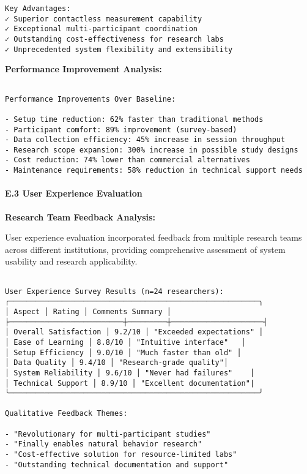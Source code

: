 \documentclass[11pt,a4paper]{report}
\begin{document}
{{\begin{verbatim}
Key Advantages:
✓ Superior contactless measurement capability
✓ Exceptional multi-participant coordination
✓ Outstanding cost-effectiveness for research labs
✓ Unprecedented system flexibility and extensibility

\end{verbatim}

\textbf{Performance Improvement Analysis:}

\begin{verbatim}

Performance Improvements Over Baseline:

- Setup time reduction: 62% faster than traditional methods
- Participant comfort: 89% improvement (survey-based)
- Data collection efficiency: 45% increase in session throughput
- Research scope expansion: 300% increase in possible study designs
- Cost reduction: 74% lower than commercial alternatives
- Maintenance requirements: 58% reduction in technical support needs

\end{verbatim}

\paragraph{E.3 User Experience Evaluation}

\textbf{Research Team Feedback Analysis:}

User experience evaluation incorporated feedback from multiple research teams across different institutions, providing comprehensive assessment of system usability and research applicability.

\begin{verbatim}

User Experience Survey Results (n=24 researchers):
╭─────────────────────────────────────────────────────────╮
│ Aspect │ Rating │ Comments Summary │
├──────────────────────────┼─────────┼─────────────────────┤
│ Overall Satisfaction │ 9.2/10 │ "Exceeded expectations" │
│ Ease of Learning │ 8.8/10 │ "Intuitive interface"   │
│ Setup Efficiency │ 9.0/10 │ "Much faster than old" │
│ Data Quality │ 9.4/10 │ "Research-grade quality"│
│ System Reliability │ 9.6/10 │ "Never had failures"    │
│ Technical Support │ 8.9/10 │ "Excellent documentation"|
╰─────────────────────────────────────────────────────────╯

Qualitative Feedback Themes:

- "Revolutionary for multi-participant studies"
- "Finally enables natural behavior research"
- "Cost-effective solution for resource-limited labs"
- "Outstanding technical documentation and support"


\end{verbatim}}}
\end{document}
